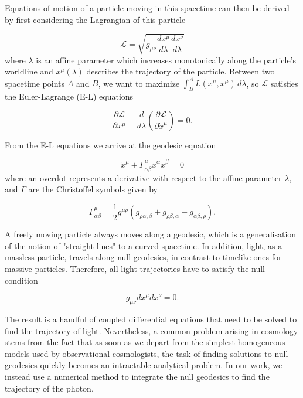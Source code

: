 Equations of motion of a particle moving in this spacetime can then be derived by first considering the Lagrangian of this particle

\begin{equation}
  \mathcal{L} = \sqrt{g_{\mu \nu} \frac{dx^{\mu}}{d \lambda} \frac{dx^{\nu}}{d \lambda}}
\end{equation}
where $\lambda$ is an affine parameter which increases monotonically along the particle's worldline and $x^{\mu}(\lambda)$ describes the trajectory of the particle. Between two spacetime points $A$ and $B$, we want to maximize $\int^{A}_{B} L(x^{\mu}, \dot{x}^{\mu})\, d \lambda$, so $\mathcal{L}$ satisfies the Euler-Lagrange (E-L) equations

\begin{equation}
  \frac{\partial \mathcal{L}}{\partial x^{\mu}} - \frac{d}{d \lambda}\left ( \frac{\partial \mathcal{L}}{\partial \dot{x}^{\mu}} \right ) = 0.
  \label{eq:euler-lagrange-eqn}
\end{equation}

From the E-L equations we arrive at the geodesic equation

\begin{equation}
  \ddot{x}^{\mu} + \Gamma^{\mu}_{\alpha \beta} \dot{x}^{\alpha} \dot{x}^{\beta} = 0 
  \label{eq:geodesic-eqn}
\end{equation}
where an overdot represents a derivative with respect to the affine parameter $\lambda$, and $\Gamma$ are the Christoffel symbols given by

\begin{equation}
  \Gamma^{\mu}_{\alpha \beta} = \frac{1}{2} g^{\mu \rho} (g_{\rho \alpha, \beta} + g_{\rho \beta, \alpha} - g_{\alpha \beta, \rho}).
  \label{eq:christoffels}
\end{equation}

A freely moving particle always moves along a geodesic, which is a generalisation of the notion of "straight lines" to a curved spacetime. In addition, light, as a massless particle, travels along null geodesics, in contrast to timelike ones for massive particles. Therefore, all light trajectories have to satisfy the null condition

\begin{equation}
  g_{\mu \nu} dx^{\mu} dx^{\nu} = 0.
  \label{eq:null-condition}
\end{equation}

The result is a handful of coupled differential equations that need to be solved to find the trajectory of light. Nevertheless, a common problem arising in cosmology stems from the fact that as soon as we depart from the simplest homogeneous models used by observational cosmologists, the task of finding solutions to null geodesics quickly becomes an intractable analytical problem. In our work, we instead use a numerical method to integrate the null geodesics to find the trajectory of the photon. 

